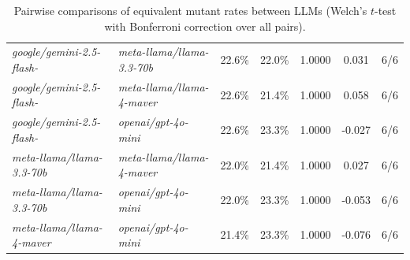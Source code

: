 \begin{table}
{\begin{tabular}{l|l|c|c|c|c|c}
\textit{google/gemini-2.5-flash-} & \textit{meta-llama/llama-3.3-70b} & 22.6\% & 22.0\% & 1.0000 & 0.031 & 6/6 \\
\textit{google/gemini-2.5-flash-} & \textit{meta-llama/llama-4-maver} & 22.6\% & 21.4\% & 1.0000 & 0.058 & 6/6 \\
\textit{google/gemini-2.5-flash-} & \textit{openai/gpt-4o-mini} & 22.6\% & 23.3\% & 1.0000 & -0.027 & 6/6 \\
\textit{meta-llama/llama-3.3-70b} & \textit{meta-llama/llama-4-maver} & 22.0\% & 21.4\% & 1.0000 & 0.027 & 6/6 \\
\textit{meta-llama/llama-3.3-70b} & \textit{openai/gpt-4o-mini} & 22.0\% & 23.3\% & 1.0000 & -0.053 & 6/6 \\
\textit{meta-llama/llama-4-maver} & \textit{openai/gpt-4o-mini} & 21.4\% & 23.3\% & 1.0000 & -0.076 & 6/6 \\
\end{tabular}
}
\caption{Pairwise comparisons of equivalent mutant rates between LLMs (Welch's $t$-test with Bonferroni correction over all pairs).}
\label{tab:llm-equiv-stats}
\end{table}
